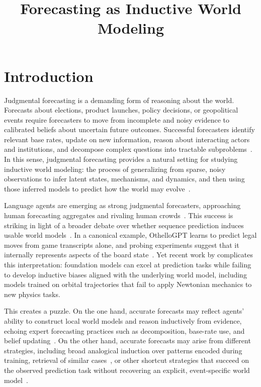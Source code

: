 \documentclass{article}
\title{Forecasting as Inductive World Modeling}
\author{ }
\date{}
\begin{document}
\maketitle


\newpage

\section{Introduction}
Judgmental forecasting is a demanding form of reasoning about the world. Forecasts about elections, product launches, policy decisions, or geopolitical events require forecasters to move from incomplete and noisy evidence to calibrated beliefs about uncertain future outcomes. Successful forecasters identify relevant base rates, update on new information, reason about interacting actors and institutions, and decompose complex questions into tractable subproblems~\citep{tetlock2016superforecasting,mellers2014psychological}. In this sense, judgmental forecasting provides a natural setting for studying inductive world modeling: the process of generalizing from sparse, noisy observations to infer latent states, mechanisms, and dynamics, and then using those inferred models to predict how the world may evolve~\citep{tenenbaum2006theory,griffiths2010probabilistic}.

Language agents are emerging as strong judgmental forecasters, approaching human forecasting aggregates and rivaling human crowds~\citep{halawi2024approaching, schoenegger2024wisdom}. This success is striking in light of a broader debate over whether sequence prediction induces usable world models~\citep{mitchell2023ai,andreas2024languagemodelsworldmodels}. In a canonical example, OthelloGPT learns to predict legal moves from game transcripts alone, and probing experiments suggest that it internally represents aspects of the board state~\citep{li2023emergent}. Yet recent work by \citet{vafa2025foundation}  complicates this interpretation: foundation models can excel at prediction tasks while failing to develop inductive biases aligned with the underlying world model, including models trained on orbital trajectories that fail to apply Newtonian mechanics to new physics tasks.

This creates a puzzle. On the one hand, accurate forecasts may reflect agents' ability to construct local world models and reason inductively from evidence, echoing expert forecasting practices such as decomposition, base-rate use, and belief updating~\citep{mellers2014psychological,tetlock2016superforecasting}.
On the other hand, accurate forecasts may arise from different strategies, including broad analogical induction over patterns encoded during training, retrieval of similar cases~\citep{kojima2022large,yasunaga2024large}, or other shortcut strategies that succeed on the observed prediction task without recovering an explicit, event-specific world model~\citep{vafa2025foundation}.
\end{document}
